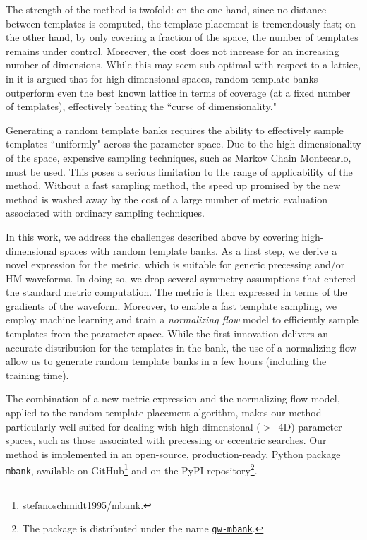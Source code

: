\documentclass[twocolumn,showpacs,preprintnumbers,nofootinbib,prd,
superscriptaddress,10pt]{revtex4-2}
\begin{document}
The strength of the method is twofold: on the one hand, since no distance between templates is computed, the template placement is tremendously fast; on the other hand, by only covering a fraction of the space, the number of templates remains under control.
Moreover, the cost does not increase for an increasing number of dimensions.
While this may seem sub-optimal with respect to a lattice, in \cite{Messenger:2008ta, Allen:2022lqr, Allen:2021yuy} it is argued that for high-dimensional spaces, random template banks outperform even the best known lattice in terms of coverage (at a fixed number of templates), effectively beating the ``curse of dimensionality."

Generating a random template banks requires the ability to effectively sample templates ``uniformly" across the parameter space. Due to the high dimensionality of the space, expensive sampling techniques, such as Markov Chain Montecarlo, must be used. This poses a serious limitation to the range of applicability of the method. Without a fast sampling method, the speed up promised by the new method is washed away by the cost of a large number of metric evaluation associated with ordinary sampling techniques.

In this work, we address the challenges described above by covering high-dimensional spaces with random template banks.
As a first step, we derive a novel expression for the metric, which is suitable for generic precessing and/or HM waveforms. In doing so, we drop several symmetry assumptions that entered the standard metric computation. The metric is then expressed in terms of the gradients of the waveform.
Moreover, to enable a fast template sampling, we employ machine learning and train a {\it normalizing flow} model to efficiently sample templates from the parameter space.
While the first innovation delivers an accurate distribution for the templates in the bank, the use of a normalizing flow allow us to generate random template banks in a few hours (including the training time).

The combination of a new metric expression and the normalizing flow model, applied to the random template placement algorithm, makes our method particularly well-suited for dealing with high-dimensional ($>$~4D) parameter spaces, such as those associated with precessing or eccentric searches.
Our method is implemented in an open-source, production-ready, Python package \texttt{mbank}\cite{mbank}, available on GitHub\footnote{
\href{https://github.com/stefanoschmidt1995/mbank}{stefanoschmidt1995/mbank}.}
and on the PyPI repository\footnote{
The package is distributed under the name \texttt{\href{https://pypi.org/project/gw-mbank/}{gw-mbank}}.
}.
\end{document}
